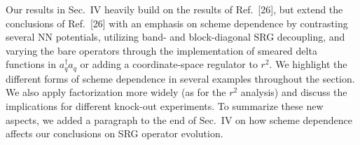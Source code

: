 \documentclass[preprintnumbers,floatfix,aps,prc,preprint,nofootinbib]{revtex4-1}
\newcommand{\ataq}{a^{\dagger}_q a_q}
\begin{document}
\begin{enumerate}
    
    Our results in Sec.~IV heavily build on the results of Ref.~[26], but extend the conclusions of Ref.~[26] with an emphasis on scheme dependence by contrasting several NN potentials, utilizing band- and block-diagonal SRG decoupling, and varying the bare operators through the implementation of smeared delta functions in $\ataq$ or adding a coordinate-space regulator to $r^2$. We highlight the different forms of scheme dependence in several examples throughout the section. 
    We also apply factorization more widely (as for the $r^2$ analysis) and discuss the implications for different knock-out experiments.
    To summarize these new aspects, we added a paragraph to the end of Sec.~IV on how scheme dependence affects our conclusions on SRG operator evolution.


\end{enumerate}
\end{document}

